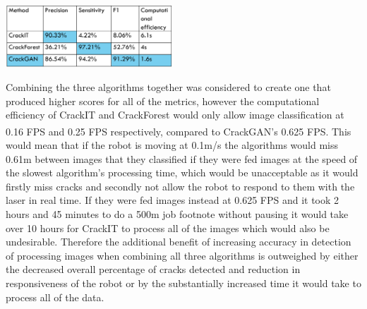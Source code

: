 \documentclass[11pt]{article}		%
\newcommand{\supercite}[1]{\textsuperscript{\cite{#1}}}		%
\newcommand{\tableref}[1]{\hyperref[#1]{Table \ref*{#1}}}     %
\begin{document}
	       \begin{floatingfigure}[r]{0.5\textwidth}
				\centering
				\includegraphics[width=0.47\textwidth]{CrackGAN_comparisonv1}
				\label{crack_comparison}
			\end{floatingfigure}
			
			 Combining the three algorithms together was considered to create one that produced higher scores for all of the metrics, however the computational efficiency of CrackIT and CrackForest would only allow image classification at 0.16 FPS and 0.25 FPS respectively, compared to CrackGAN’s 0.625 FPS.\supercite{CrackGAN1}  This would mean that if the robot is moving at 0.1m/s the algorithms would miss 0.61m between images that they classified if they were fed images at the speed of the slowest algorithm’s processing time, which would be unacceptable as it would firstly miss cracks and secondly not allow the robot to respond to them with the laser in real time. If they were fed images instead at 0.625 FPS and it took 2 hours and 45 minutes to do a 500m job footnote without pausing it would take over 10 hours for CrackIT to process all of the images which would also be undesirable. Therefore the additional benefit of increasing accuracy in detection of processing images when combining all three algorithms is outweighed by either the decreased overall percentage of cracks detected and reduction in responsiveness of the robot or by the substantially increased time it would take to process all of the data.
			
	        
\end{document}

